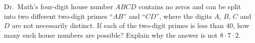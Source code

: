 Dr.\ Math's four-digit house number $ABCD$ contains no zeros and can be split into two different two-digit primes ``$AB$'' and ``$CD$'', where the digits $A$, $B$, $C$ and $D$ are not necessarily distinct. If each of the two-digit primes is less than $40$, how many such house numbers are possible? Explain why the answer is not $8\cdot7\cdot2$.
